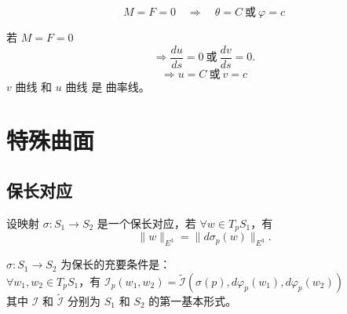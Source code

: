 \documentclass[lang=cn,10pt,thmcnt=section]{elegantbook}
\begin{document}
\begin{example}[球面]
    \[
M = F = 0 \quad \Rightarrow \quad \theta = C \ \text{或} \ \varphi = c
\]
\end{example}

\begin{corollary}
    若 \( M = F = 0 \)
\[
\Rightarrow \frac{du}{ds} = 0 \ \text{或} \ \frac{dv}{ds} = 0.
\]
\[
\Rightarrow u = C \ \text{或} \ v = c
\]
\(v\) 曲线 和 \( u \) 曲线 是 曲率线。
\end{corollary}

\chapter{特殊曲面}
\section{保长对应}
\begin{definition}[保长对应]
    设映射 $\sigma: S_1 \rightarrow S_2$ 是一个保长对应，若 $\forall w \in T_p S_1$，有
\[
\|w\|_{E^3} = \|d\sigma_p(w)\|_{E^3}.
\]
\end{definition}
\begin{proposition}
    $\sigma: S_1 \rightarrow S_2$ 为保长的充要条件是：\\
$\forall w_1, w_2 \in T_p S_1$，有 $\mathcal{I}_p(w_1, w_2) = \widetilde{\mathcal{I}}(\sigma(p), d\varphi_p(w_1), d\varphi_p(w_2))$\\
其中 $\mathcal{I}$ 和 $\widetilde{\mathcal{I}}$ 分别为 $S_1$ 和 $S_2$ 的第一基本形式。
\end{proposition}
\end{document}
